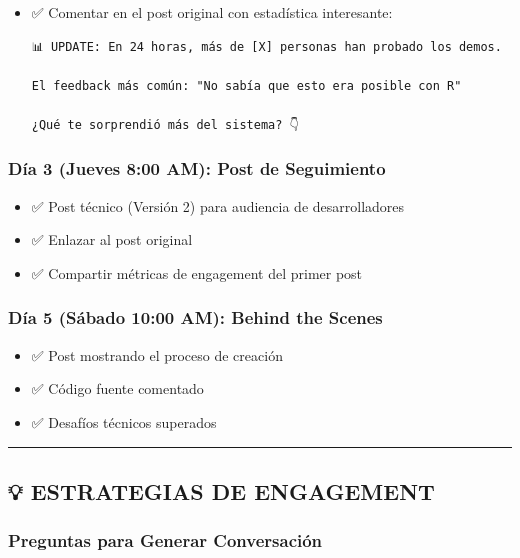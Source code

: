 \documentclass[
]{article}
\providecommand{\tightlist}{%
  \setlength{\itemsep}{0pt}\setlength{\parskip}{0pt}}
\begin{document}
\begin{itemize}
\item
  ✅ Comentar en el post original con estadística interesante:

\begin{verbatim}
📊 UPDATE: En 24 horas, más de [X] personas han probado los demos.

El feedback más común: "No sabía que esto era posible con R"

¿Qué te sorprendió más del sistema? 👇
\end{verbatim}
\end{itemize}

\subsubsection{Día 3 (Jueves 8:00 AM): Post de
Seguimiento}\label{duxeda-3-jueves-800-am-post-de-seguimiento}

\begin{itemize}
\tightlist
\item
  ✅ Post técnico (Versión 2) para audiencia de desarrolladores
\item
  ✅ Enlazar al post original
\item
  ✅ Compartir métricas de engagement del primer post
\end{itemize}

\subsubsection{Día 5 (Sábado 10:00 AM): Behind the
Scenes}\label{duxeda-5-suxe1bado-1000-am-behind-the-scenes}

\begin{itemize}
\tightlist
\item
  ✅ Post mostrando el proceso de creación
\item
  ✅ Código fuente comentado
\item
  ✅ Desafíos técnicos superados
\end{itemize}

\begin{center}\rule{0.5\linewidth}{0.5pt}\end{center}

\subsection{💡 ESTRATEGIAS DE
ENGAGEMENT}\label{estrategias-de-engagement}

\subsubsection{Preguntas para Generar
Conversación}\label{preguntas-para-generar-conversaciuxf3n}
\end{document}
